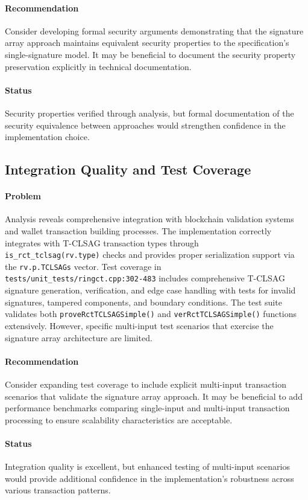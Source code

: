 \documentclass{article}
\begin{document}
\paragraph{Recommendation}
Consider developing formal security arguments demonstrating that the signature 
array approach maintains equivalent security properties to the specification's 
single-signature model.  It may be beneficial to document the security property 
preservation explicitly in technical documentation.

\paragraph{Status}
Security properties verified through analysis, but formal documentation of 
the security equivalence between approaches would strengthen confidence in 
the implementation choice.

\subsection{Integration Quality and Test Coverage}
\paragraph{Problem}
Analysis reveals comprehensive integration with blockchain validation systems 
and wallet transaction building processes.  The implementation correctly 
integrates with T-CLSAG transaction types through \\\texttt{is\_rct\_tclsag(rv.type)} 
checks and provides proper serialization support via the 
\texttt{rv.p.TCLSAGs} vector.  Test coverage in \\\texttt{tests/unit\_tests/ringct.cpp:302-483} 
includes comprehensive T-CLSAG signature generation, verification, and edge case handling 
with tests for invalid signatures, tampered components, and boundary conditions.  
The test suite validates both \texttt{proveRctTCLSAGSimple()} and \texttt{verRctTCLSAGSimple()} 
functions extensively. However, specific multi-input test scenarios that exercise 
the signature array architecture are limited.

\paragraph{Recommendation}
Consider expanding test coverage to include explicit multi-input transaction 
scenarios that validate the signature array approach.  It may be beneficial 
to add performance benchmarks comparing single-input and multi-input 
transaction processing to ensure scalability characteristics are acceptable.

\paragraph{Status}
Integration quality is excellent, but enhanced testing of multi-input 
scenarios would provide additional confidence in the implementation's 
robustness across various transaction patterns.
\end{document}
